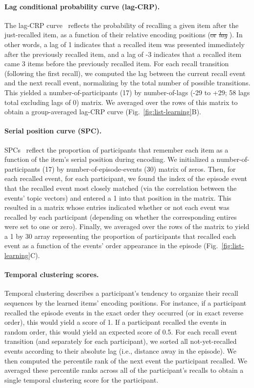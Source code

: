 \documentclass[10pt]{article}
\renewcommand{\includegraphics}[2][]{} %
\providecommand{\DIFaddtex}[1]{{\protect\color{blue}\uwave{#1}}} %
\providecommand{\DIFdeltex}[1]{{\protect\color{red}\sout{#1}}}                      %
\providecommand{\DIFaddbegin}{} %
\providecommand{\DIFaddend}{} %
\providecommand{\DIFdelbegin}{} %
\providecommand{\DIFdelend}{} %
\providecommand{\DIFadd}[1]{\texorpdfstring{\DIFaddtex{#1}}{#1}} %
\providecommand{\DIFdel}[1]{\texorpdfstring{\DIFdeltex{#1}}{}} %
\newcommand{\DIFscaledelfig}{0.5}
\newlength{\DIFdelgraphicswidth} %
\newlength{\DIFdelgraphicsheight} %
\newcommand{\DIFaddincludegraphics}[2][]{{\color{blue}\fbox{\DIFOincludegraphics[#1]{#2}}}} %
\newcommand{\DIFdelincludegraphics}[2][]{%
\sbox{\DIFdelgraphicsbox}{\DIFOincludegraphics[#1]{#2}}%
\settoboxwidth{\DIFdelgraphicswidth}{\DIFdelgraphicsbox} %
\settoboxtotalheight{\DIFdelgraphicsheight}{\DIFdelgraphicsbox} %
\scalebox{\DIFscaledelfig}{%
\parbox[b]{\DIFdelgraphicswidth}{\usebox{\DIFdelgraphicsbox}\\[-\baselineskip] \rule{\DIFdelgraphicswidth}{0em}}\llap{\resizebox{\DIFdelgraphicswidth}{\DIFdelgraphicsheight}{%
\setlength{\unitlength}{\DIFdelgraphicswidth}%
\begin{picture}(1,1)%
\thicklines\linethickness{2pt} %
{\color[rgb]{1,0,0}\put(0,0){\framebox(1,1){}}}%
{\color[rgb]{1,0,0}\put(0,0){\line( 1,1){1}}}%
{\color[rgb]{1,0,0}\put(0,1){\line(1,-1){1}}}%
\end{picture}%
}\hspace*{3pt}}} %
} %
\DeclareRobustCommand{\DIFaddbegin}{\DIFOaddbegin \let\includegraphics\DIFaddincludegraphics} %
\DeclareRobustCommand{\DIFaddend}{\DIFOaddend \let\includegraphics\DIFOincludegraphics} %
\DeclareRobustCommand{\DIFdelbegin}{\DIFOdelbegin \let\includegraphics\DIFdelincludegraphics} %
\DeclareRobustCommand{\DIFdelend}{\DIFOaddend \let\includegraphics\DIFOincludegraphics} %
\begin{document}
\paragraph{Lag conditional probability curve (lag-CRP).} The lag-CRP curve~\citep{Kaha96} reflects the probability of recalling a given item after the just-recalled item, as a function of their relative encoding positions (\DIFdelbegin \DIFdel{or }\textit{\DIFdel{lag}}%
\DIFdelend \DIFaddbegin \DIFadd{lag}\DIFaddend ).  In other words, a lag of 1 indicates that a recalled item was presented immediately after the previously recalled item, and a lag of -3 indicates that a recalled item came 3 items before the previously recalled item.  For each recall transition (following the first recall), we computed the lag between the current recall event and the next recall event, normalizing by the total number of possible transitions.  This yielded a number-of-participants (17) by number-of-lags (-29 to +29; 58 lags total excluding lags of 0) matrix. We averaged over the rows of this matrix to obtain a group-averaged lag-CRP curve (Fig.~\ref{fig:list-learning}B).

\paragraph{Serial position curve (SPC).} SPCs~\citep{Murd62a} reflect the proportion of participants that remember each item as a function of the item's serial position during encoding. We initialized a number-of-participants (17) by number-of-episode-events (30) matrix of zeros. Then, for each recalled event, for each participant, we found the index of the episode event that the recalled event most closely matched (via the correlation between the events' topic vectors) and entered a 1 into that position in the matrix. This resulted in a matrix whose entries indicated whether or not each event was recalled by each participant (depending on whether the corresponding entires were set to one or zero).  Finally, we averaged over the rows of the matrix to yield a 1 by 30 array representing the proportion of participants that recalled each event as a function of the events' order appearance in the episode (Fig.~\ref{fig:list-learning}C).

\paragraph{Temporal clustering scores.} Temporal clustering describes a participant's tendency to organize their recall sequences by the learned items' encoding positions.  For instance, if a participant recalled the episode events in the exact order they occurred (or in exact reverse order), this would yield a score of 1.  If a participant recalled the events in random order, this would yield an expected score of 0.5.  For each recall event transition (and separately for each participant), we sorted all not-yet-recalled events according to their absolute lag (i.e., distance away in the episode).  We then computed the percentile rank of the next event the participant recalled.  We averaged these percentile ranks across all of the participant's recalls to obtain a single temporal clustering score for the participant.
\end{document}

